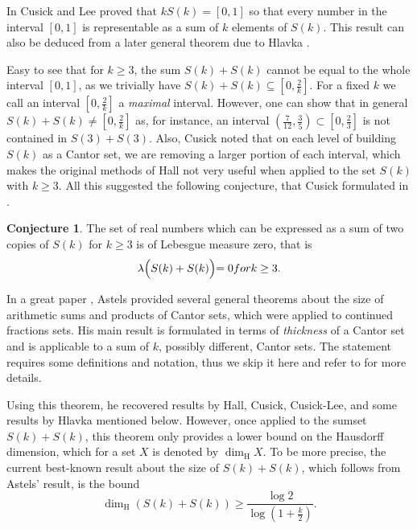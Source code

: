 \documentclass{amsart}
\newtheorem{theorem}{Theorem}[section]
\theoremstyle{definition}
\newtheorem{conjecture}[theorem]{Conjecture}
\newcommand{\0}{\mbf 0}%
\renewcommand{\text}{\textup}
\newcommand\hdim{\dim_{\mathrm H}}
\begin{document}
In \cite{MR0282924} Cusick and Lee proved that $kS(k)=[0,1]$ so that every number in the interval $[0,1]$ is representable as a sum of $k$ elements of $S(k)$. This result can also be deduced from a later general theorem due to Hlavka \cite{MR0376545}.

Easy to see that for $k\geq3$, the sum $S(k)+S(k)$ cannot be equal to the whole interval $[0,1]$, as we trivially have $S(k)+S(k)\subseteq \left[0,\frac{2}{k} \right]$. For a fixed $k$ we call an interval $[0,\frac{2}{k}]$ a \textit{maximal} interval. However, one can show that in general $S(k)+S(k)\neq \left[0,\frac{2}{k} \right]$ as, for instance, an interval $\left(\frac{7}{12}, \frac{3}{5}\right) \subset \left[0,\frac{2}{3}\right]$ is not contained in $S(3)+S(3)$. Also, Cusick noted that on each level of building $S(k)$ as a Cantor set, we are removing a larger portion of each interval, which makes the original methods of Hall not very useful when applied to the set $S(k)$ with $k\geq3$. All this suggested the following conjecture, that Cusick formulated in \cite{MR0269603}.
\begin{conjecture}\label{conjecture:main}
    The set of real numbers which can be expressed as a sum of two copies of $S(k)$ for $k\geq3$ is of Lebesgue measure zero, that is
 $$\lambda\Bigl( S(k)+S(k) \Bigl)= 0 \text{ for }k\geq 3.$$
\end{conjecture}






 In a great paper \cite{MR1491854}, Astels provided several general theorems about the size of arithmetic sums and products of Cantor sets, which were applied to continued fractions sets. His main result is formulated in terms of {\it thickness} of a Cantor set and is applicable to a sum of $k$, possibly different, Cantor sets. The statement requires some definitions and notation, thus we skip it here and refer to \cite{MR1491854} for more details.
 
 
 
 Using this theorem, he recovered results by Hall, Cusick, Cusick-Lee, and some results by Hlavka mentioned below. However, once applied to the sumset $S(k)+S(k)$, this theorem only provides a lower bound on the Hausdorff dimension, which for a set $X$ is denoted by $\hdim X$. To be more precise, the current best-known result about the size of $S(k)+S(k)$, which follows from Astels' result, is the bound
\begin{equation}\label{hdim:bound:astels}
\hdim \left( S(k)+S(k) \right) \geq \frac{\log 2}{\log\left( 1+\frac{k}{2} \right)}.
\end{equation}
 
\end{document}
